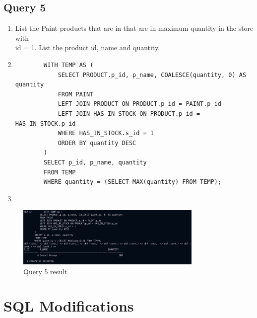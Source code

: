\documentclass[a4paper,11pt]{article}
\begin{document}
\subsection*{Query 5}
\begin{enumerate}[label=(\alph*)]
    \item List the Paint products that are in that are in maximum quantity in the store with \\id = 1.
        List the product id, name and quantity.
    \item
        \begin{lstlisting}
        WITH TEMP AS (
            SELECT PRODUCT.p_id, p_name, COALESCE(quantity, 0) AS quantity
            FROM PAINT
            LEFT JOIN PRODUCT ON PRODUCT.p_id = PAINT.p_id
            LEFT JOIN HAS_IN_STOCK ON PRODUCT.p_id = HAS_IN_STOCK.p_id
            WHERE HAS_IN_STOCK.s_id = 1
            ORDER BY quantity DESC
        )
        SELECT p_id, p_name, quantity
        FROM TEMP
        WHERE quantity = (SELECT MAX(quantity) FROM TEMP);
        \end{lstlisting}
    \item 
\end{enumerate}
\begin{figure}[H]
    \centering
    \includegraphics[width=0.8\textwidth]{Query5.png}
    \caption{Query 5 result}
\end{figure}

\section{SQL Modifications}
\end{document}
